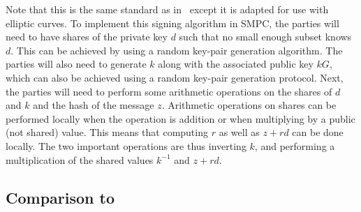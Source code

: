 \documentclass{article}
\theoremstyle{remark}
\begin{document}
Note that this is the same standard as in~\cite{gjkr96} except it is adapted
for use with elliptic curves. To implement this signing algorithm in SMPC, the
parties will need to have shares of the private key $d$ such that no small
enough subset knows $d$. This can be achieved by using a random key-pair
generation algorithm. The parties will also need to generate $k$ along with the
associated public key $kG$, which can also be achieved using a random key-pair
generation protocol. Next, the parties will need to perform some arithmetic
operations on the shares of $d$ and $k$ and the hash of the message $z$.
Arithmetic operations on shares can be performed locally when the operation is
addition or when multiplying by a public (not shared) value. This means that
computing $r$ as well as $z + rd$ can be done locally. The two important
operations are thus inverting $k$, and performing a multiplication of the
shared values $k^{-1}$ and $z + rd$.

\subsection{Comparison to~\cite{gjkr96}}
\end{document}
